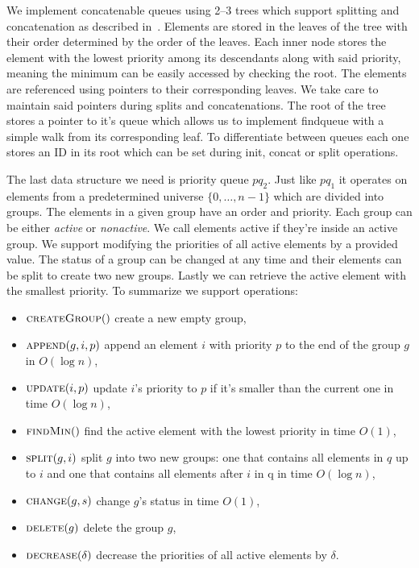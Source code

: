 We implement concatenable queues using 2–3 trees which support splitting and concatenation as described in~\cite{aho1974design}. Elements are stored in the leaves of the tree with their order determined by the order of the leaves. Each inner node stores the element with the lowest priority among its descendants along with said priority, meaning the minimum can be easily accessed by checking the root. The elements are referenced using pointers to their corresponding leaves. We take care to maintain said pointers during splits and concatenations. The root of the tree stores a pointer to it's queue which allows us to implement findqueue with a simple walk from its corresponding leaf. To differentiate between queues each one stores an ID in its root which can be set during init, concat or split operations. 

The last data structure we need is priority queue $pq_2$. Just like $pq_1$ it operates on elements from a predetermined universe $\{0, \dots, n-1\}$ which are divided into groups. The elements in a given group have an order and priority. Each group can be either \textit{active} or \textit{nonactive}. We call elements active if they're inside an active group. We support modifying the priorities of all active elements by a provided value. The status of a group can be changed at any time and their elements can be split to create two new groups. Lastly we can retrieve the active element with the smallest priority. To summarize we support operations:

\begin{itemize}
    \item $\textsc{createGroup}()$ create a new empty group,
    \item $\textsc{append}(g, i, p)$ append an element $i$ with priority $p$ to the end of the group $g$ in $O(\log n)$,
    \item $\textsc{update}(i, p)$ update $i$'s priority to $p$ if it's smaller than the current one in time $O(\log n)$,
    \item $\textsc{findMin}()$ find the active element with the lowest priority in time $O(1)$,
    \item $\textsc{split}(g, i)$ split $g$ into two new groups: one that contains all elements in $q$ up to $i$ and one that contains all elements after $i$ in q in time $O(\log n)$,
    \item $\textsc{change}(g, s)$ change $g$'s status in time $O(1)$,
    \item $\textsc{delete}(g)$ delete the group $g$,
    \item $\textsc{decrease}(\delta)$ decrease the priorities of all active elements by $\delta$.
\end{itemize}


